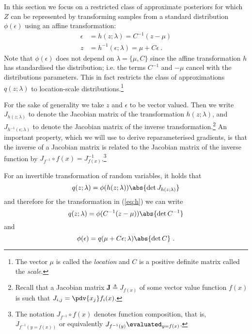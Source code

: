 \documentclass[a4paper,11pt]{article}
\begin{document}
In this section we focus on a restricted class of approximate posteriors for which $Z$ can be represented by transforming samples from a standard distribution $\phi(\epsilon)$ using an affine transformation:
\begin{subequations}\label{eq:h}
\begin{align}
\epsilon &= h(z; \lambda) = C^{-1} (z - \mu)  \\
z &= h^{-1}(\epsilon; \lambda) = \mu + C\epsilon ~ .
\end{align}
\end{subequations}
Note that $\phi(\epsilon)$ does not depend on $\lambda = \{\mu, C\}$ since the affine transformation $ h $ has standardised the
distribution; i.e. the terms $ C^{-1} $ and $ - \mu $ cancel with the distributions parameters. This in fact restricts the class of approximations $q(z; \lambda)$ to location-scale distributions.\footnote{The vector $\mu$ is called the \emph{location} and $C$ is a positive definite matrix called the \emph{scale}.}

For the sake of generality we take $z$ and $\epsilon$ to be vector valued. 
Then we write $J_{h(z; \lambda)}$ to denote the Jacobian matrix of the transformation $h(z; \lambda)$, and $J_{h^{-1}(\epsilon; \lambda)}$ to denote the Jacobian matrix of the inverse transformation.\footnote{Recall that a Jacobian matrix $\mathbf J \triangleq J_{f(x)}$ of some vector value function $f(x)$ is such that $J_{i,j} = \pdv{x_j} f_i(x)$.} 
An important property, which we will use to derive reparameterised gradients, is that the inverse of a Jacobian matrix is related to the Jacobian matrix of the inverse function by $J_{f^{-1}} \circ f(x)= J^{-1}_{f(x)}$.\footnote{The notation $J_{f^{-1}} \circ f(x)$ denotes function composition, that is, $J_{f^{-1}(y=f(x))}$ or equivalently $J_{f^{-1}(y)}\evaluated_{y=f(x)}$.}

For an invertible transformation of random variables, it holds that 
\begin{equation}\label{eq:change-to-phi}
q(z;\lambda) = \phi(h(z; \lambda))\abs{\det J_{h(z; \lambda)}}
\end{equation}
and therefore for the transformation in (\ref{eq:h}) we can write
\begin{equation}
q(z;\lambda) = \phi(C^{-1}(z - \mu))\abs{\det C^{-1}} 
\end{equation}
and
\begin{equation}
\phi(\epsilon) = q(\mu + C\epsilon; \lambda)\abs{\det C} ~ .
\end{equation}
\end{document}
